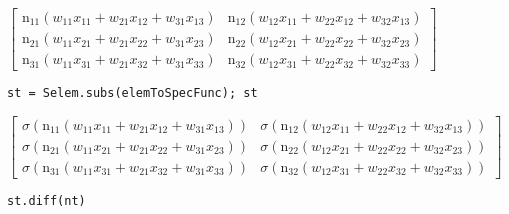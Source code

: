 \documentclass[
]{article}
\begin{document}
\(\displaystyle \left[\begin{matrix}\operatorname{n_{11}}{\left(w_{11} x_{11} + w_{21} x_{12} + w_{31} x_{13} \right)} & \operatorname{n_{12}}{\left(w_{12} x_{11} + w_{22} x_{12} + w_{32} x_{13} \right)}\\\operatorname{n_{21}}{\left(w_{11} x_{21} + w_{21} x_{22} + w_{31} x_{23} \right)} & \operatorname{n_{22}}{\left(w_{12} x_{21} + w_{22} x_{22} + w_{32} x_{23} \right)}\\\operatorname{n_{31}}{\left(w_{11} x_{31} + w_{21} x_{32} + w_{31} x_{33} \right)} & \operatorname{n_{32}}{\left(w_{12} x_{31} + w_{22} x_{32} + w_{32} x_{33} \right)}\end{matrix}\right]\)

\begin{verbatim}
st = Selem.subs(elemToSpecFunc); st
\end{verbatim}

\(\displaystyle \left[\begin{matrix}\sigma{\left(\operatorname{n_{11}}{\left(w_{11} x_{11} + w_{21} x_{12} + w_{31} x_{13} \right)} \right)} & \sigma{\left(\operatorname{n_{12}}{\left(w_{12} x_{11} + w_{22} x_{12} + w_{32} x_{13} \right)} \right)}\\\sigma{\left(\operatorname{n_{21}}{\left(w_{11} x_{21} + w_{21} x_{22} + w_{31} x_{23} \right)} \right)} & \sigma{\left(\operatorname{n_{22}}{\left(w_{12} x_{21} + w_{22} x_{22} + w_{32} x_{23} \right)} \right)}\\\sigma{\left(\operatorname{n_{31}}{\left(w_{11} x_{31} + w_{21} x_{32} + w_{31} x_{33} \right)} \right)} & \sigma{\left(\operatorname{n_{32}}{\left(w_{12} x_{31} + w_{22} x_{32} + w_{32} x_{33} \right)} \right)}\end{matrix}\right]\)

\begin{verbatim}
st.diff(nt)
\end{verbatim}
\end{document}
